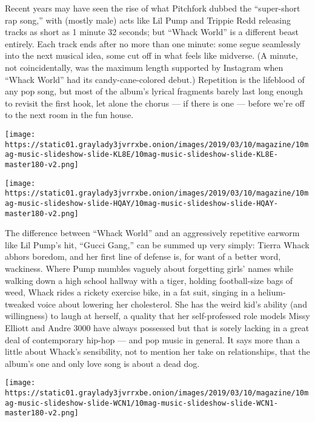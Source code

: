 Recent years may have seen the rise of what Pitchfork dubbed the
``super-short rap song,'' with (mostly male) acts like Lil Pump and
Trippie Redd releasing tracks as short as 1 minute 32 seconds; but
``Whack World'' is a different beast entirely. Each track ends after no
more than one minute: some segue seamlessly into the next musical idea,
some cut off in what feels like midverse. (A minute, not coincidentally,
was the maximum length supported by Instagram when ``Whack World'' had
its candy-cane-colored debut.) Repetition is the lifeblood of any pop
song, but most of the album's lyrical fragments barely last long enough
to revisit the first hook, let alone the chorus --- if there is one ---
before we're off to the next room in the fun house.

\texttt{[image: https://static01.graylady3jvrrxbe.onion/images/2019/03/10/magazine/10mag-music-slideshow-slide-KL8E/10mag-music-slideshow-slide-KL8E-master180-v2.png]}

\texttt{[image: https://static01.graylady3jvrrxbe.onion/images/2019/03/10/magazine/10mag-music-slideshow-slide-HQAY/10mag-music-slideshow-slide-HQAY-master180-v2.png]}

The difference between ``Whack World'' and an aggressively repetitive
earworm like Lil Pump's hit, ``Gucci Gang,'' can be summed up very
simply: Tierra Whack abhors boredom, and her first line of defense is,
for want of a better word, wackiness. Where Pump mumbles vaguely about
forgetting girls' names while walking down a high school hallway with a
tiger, holding football-size bags of weed, Whack rides a rickety
exercise bike, in a fat suit, singing in a helium-tweaked voice about
lowering her cholesterol. She has the weird kid's ability (and
willingness) to laugh at herself, a quality that her self-professed role
models Missy Elliott and Andre 3000 have always possessed but that is
sorely lacking in a great deal of contemporary hip-hop --- and pop music
in general. It says more than a little about Whack's sensibility, not to
mention her take on relationships, that the album's one and only love
song is about a dead dog.

\texttt{[image: https://static01.graylady3jvrrxbe.onion/images/2019/03/10/magazine/10mag-music-slideshow-slide-WCN1/10mag-music-slideshow-slide-WCN1-master180-v2.png]}

